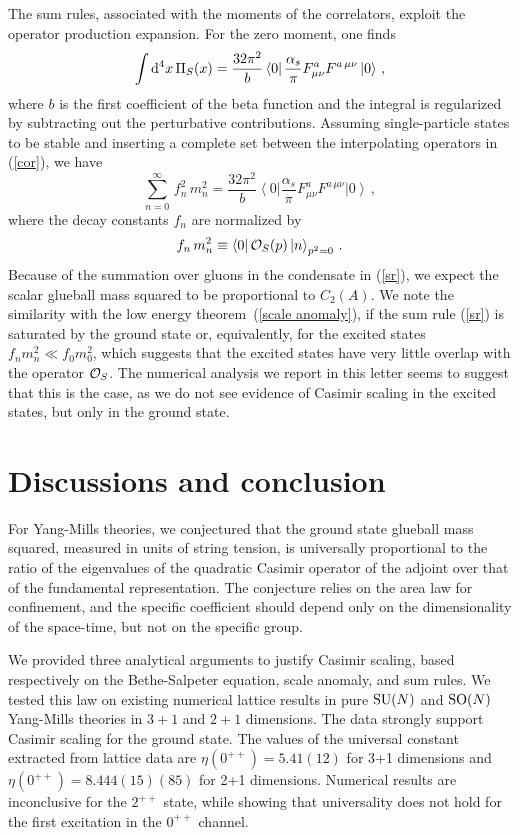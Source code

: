 \documentclass[prl,aps,
showpacs,
preprint,
nofootinbib,
floatfix,
superscriptaddress, showkeys
]{revtex4-1}
\begin{document}
The sum rules, associated with the moments of the correlators, exploit the operator production expansion.
For the zero moment, one finds~\cite{Novikov:1980dj}
\begin{equation}
\int{\rm d}^4x\,\Pi_S(x)=\frac{32\pi^2}{b}\left<0\right|\frac{\alpha_s}{\pi}F_{\mu\nu}^aF^{a\,\mu\nu}\left|0\right>\,,
\end{equation}
where $b$ is the first coefficient of the beta function and the integral is regularized by subtracting out the perturbative contributions.
Assuming 
single-particle states to be stable and
inserting a complete set between the interpolating operators in (\ref{cor}), we have
\begin{equation}
\sum_{n=0}^{\infty}\,f_n^2\,m_n^2=\frac{32\pi^2}{b}\left<0\right|\frac{\alpha_s}{\pi}F_{\mu\nu}^aF^{a\,\mu\nu}\left|0\right>\,,
\label{sr}
\end{equation} 
where the decay constants $f_n$ are normalized by
\begin{equation}
f_n\,m_n^2\equiv \left<0\right|{\cal O}_S(p)\left|n\right>_{p^2=0}\,.
\end{equation}
Because of the summation over gluons in the condensate in (\ref{sr}), 
we expect the scalar glueball mass squared to be proportional to  $C_2(A)$. 
We note the similarity with  the low energy theorem~(\ref{scale anomaly}), if the sum rule (\ref{sr}) is saturated by the ground state or, equivalently, for the excited states $f_nm_n^2\ll f_0m_0^2$, which suggests that the excited states have very little overlap with the operator ${\cal O}_S$. The numerical analysis we report in this letter seems to suggest that this is the case, as we do not see evidence of Casimir scaling in the excited states, but only in the ground state.

\section{Discussions and conclusion}
For Yang-Mills theories, %
we conjectured that the ground state 
glueball mass squared, measured in units of string tension, is 
universally proportional to the ratio of the eigenvalues of the quadratic Casimir operator of the adjoint over that of the fundamental representation. 
The conjecture relies on the  %
area law for confinement,
and the specific coefficient should depend only on the dimensionality of the space-time,
but not on the specific group.

We provided three  analytical arguments to justify Casimir scaling, based respectively on the
Bethe-Salpeter equation, scale anomaly, and sum rules. 
We tested this law on existing numerical  lattice results in pure ${\rm SU}(N)$ and ${\rm SO}(N)$ 
Yang-Mills theories in $3+1$ and $2+1$ dimensions. 
The data strongly support  Casimir scaling for the ground state.  
The values of the universal constant extracted from  lattice data are $\eta(0^{++})=5.41(12)$ for 3+1 
dimensions and $\eta(0^{++})=8.444(15)(85)$ for 2+1 dimensions. 
Numerical results are 
inconclusive for the $2^{++}$ state, while showing that universality does not hold 
for the first excitation in the  $0^{ ++}$ channel.
\end{document}
